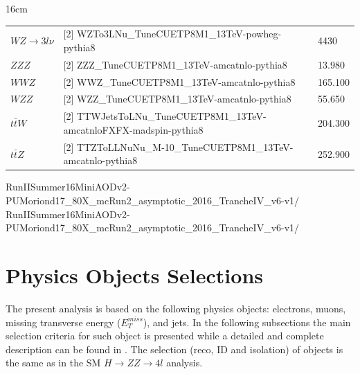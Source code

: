 \begin{landscape}
\begin{table}[hbtp]{16cm}
\begin{tabular}{l|l|l}
		$WZ \rightarrow 3l\nu$ & [2] WZTo3LNu\_TuneCUETP8M1\_13TeV-powheg-pythia8 & 4430\\
		$ZZZ$ & [2] ZZZ\_TuneCUETP8M1\_13TeV-amcatnlo-pythia8 & 13.980\\
		$WWZ$ & [2] WWZ\_TuneCUETP8M1\_13TeV-amcatnlo-pythia8 & 165.100\\
		$WZZ$ & [2] WZZ\_TuneCUETP8M1\_13TeV-amcatnlo-pythia8 & 55.650\\
		$t\bar{t}W$ & [2] TTWJetsToLNu\_TuneCUETP8M1\_13TeV-amcatnloFXFX-madspin-pythia8 & 204.300\\
		$t\bar{t}Z$ & [2] TTZToLLNuNu\_M-10\_TuneCUETP8M1\_13TeV-amcatnlo-pythia8 & 252.900\\
		\hline
	\end{tabular}
	\begin{flushleft}
		[1] RunIISummer16MiniAODv2-PUMoriond17\_80X\_mcRun2\_asymptotic\_2016\_TrancheIV\_v6-v1/
		\newline
		[2] RunIISummer16MiniAODv2-PUMoriond17\_80X\_mcRun2\_asymptotic\_2016\_TrancheIV\_v6-v1/		
	\end{flushleft}
	\label{tab:simulated_samples_list}
\end{table}
\end{landscape}

\chapter{Physics Objects Selections}
\label{sec:physics_objects_selections}
The present analysis is based on the following physics objects: electrons, muons, missing transverse energy ($E_{T}^{miss}$), and jets. In the following subsections the main selection criteria for such object is presented while a detailed and complete description can be found in \cite{bib:CMS-AN-16-442,bib:CMS-AN-16-217}. The selection (reco, ID and isolation) of objects is the same as in the SM $H \rightarrow ZZ \rightarrow 4l$ analysis.

